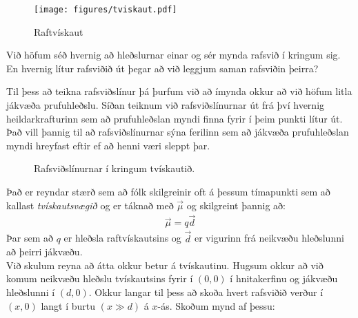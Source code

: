 \begin{figure}[H]
    \centering
    \texttt{[image: figures/tviskaut.pdf]}
    \caption{Raftvískaut}
\end{figure}

Við höfum séð hvernig að hleðslurnar einar og sér mynda rafsvið í kringum sig. En hvernig lítur rafsviðið út þegar að við leggjum saman rafsviðin þeirra?

Til þess að teikna rafsviðslínur þá þurfum við að ímynda okkur að við höfum litla jákvæða prufuhleðslu. Síðan teiknum við rafsviðslínurnar út frá því hvernig heildarkrafturinn sem að prufuhleðslan myndi finna fyrir í þeim punkti lítur út. Það vill þannig til að rafsviðslínurnar sýna ferilinn sem að jákvæða prufuhleðslan myndi hreyfast eftir ef að henni væri sleppt þar.

\begin{figure}[H]
    \centering
    \caption{Rafsviðslínurnar í kringum tvískautið.}
\end{figure}

Það er reyndar stærð sem að fólk skilgreinir oft á þessum tímapunkti sem að kallast \emph{tvískautsvægið} og er táknað með $\vec{\mu}$ og skilgreint þannig að:
\begin{align*}
    \vec{\mu} = q \vec{d}
\end{align*}
Þar sem að $q$ er hleðsla raftvískautsins og $\vec{d}$ er vigurinn frá neikvæðu hleðslunni að þeirri jákvæðu. \\

Við skulum reyna að átta okkur betur á tvískautinu. Hugsum okkur að við komum neikvæðu hleðslu tvískautsins fyrir í $(0,0)$ í hnitakerfinu og jákvæðu hleðslunni í $(d,0)$. Okkur langar til þess að skoða hvert rafsviðið verður í $(x,0)$ langt í burtu $(x \gg d)$ á $x$-ás. Skoðum mynd af þessu:
 
